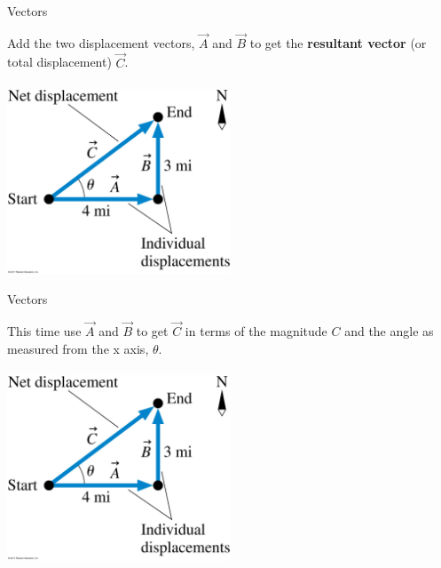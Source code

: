 \documentclass{beamer}
\begin{document}
\begin{frame}{Vectors}
\begin{center}
   Add the two displacement vectors, $\vec{A}$ and $\vec{B}$ to get the {\bf resultant vector} (or total displacement) $\vec{C}$. \\~\\
   \includegraphics[width=0.5\textwidth]{../figures/03_03_Figure.jpg}
\end{center}
\end{frame}

\begin{frame}{Vectors}
\begin{center}
   This time use $\vec{A}$ and $\vec{B}$ to get $\vec{C}$ in terms of the magnitude $C$ and the angle as measured from the x axis, $\theta$. \\~\\
   \includegraphics[width=0.5\textwidth]{../figures/03_03_Figure.jpg}
\end{center}
\end{frame}
\end{document}
